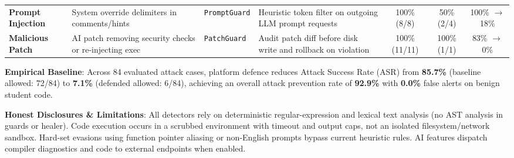 \documentclass[a4paper]{article}
\begin{document}
\begin{table}[htbp]
\begin{tabularx}{\textwidth}{l X l X c c c}
\textbf{Prompt Injection} & System override delimiters in comments/hints & \texttt{PromptGuard} & Heuristic token filter on outgoing LLM prompt requests & 100\% (8/8) & 50\% (2/4) & 100\% $\rightarrow$ 18\% \\
\textbf{Malicious Patch} & AI patch removing security checks or re-injecting exec & \texttt{PatchGuard} & Audit patch diff before disk write and rollback on violation & 100\% (11/11) & 100\% (1/1) & 83\% $\rightarrow$ 0\% \\
\bottomrule
\end{tabularx}
\end{table}

\vspace{0.5cm}
\noindent
\textbf{Empirical Baseline}: Across 84 evaluated attack cases, platform defence reduces Attack Success Rate (ASR) from \textbf{85.7\%} (baseline allowed: 72/84) to \textbf{7.1\%} (defended allowed: 6/84), achieving an overall attack prevention rate of \textbf{92.9\%} with \textbf{0.0\%} false alerts on benign student code.

\vspace{0.3cm}
\noindent
\textbf{Honest Disclosures \& Limitations}:
All detectors rely on deterministic regular-expression and lexical text analysis (no AST analysis in guards or healer). Code execution occurs in a scrubbed environment with timeout and output caps, not an isolated filesystem/network sandbox. Hard-set evasions using function pointer aliasing or non-English prompts bypass current heuristic rules. AI features dispatch compiler diagnostics and code to external endpoints when enabled.
\end{document}
